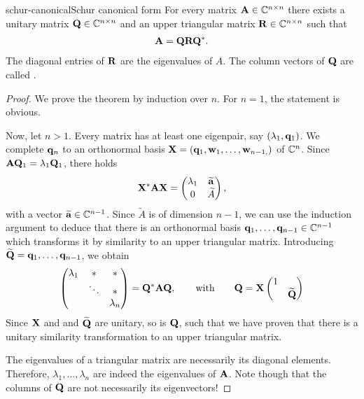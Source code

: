 \begin{Theorem*}{schur-canonical}{Schur canonical form}
  For every matrix $\mathbf A\in\mathbb C^{n\times n}$ there exists a unitary matrix
  $\mathbf Q\in\mathbb C^{n\times n}$ and an upper triangular matrix $\mathbf R\in\mathbb C^{n\times n}$ such
  that
  \begin{gather}
    \mathbf A = \mathbf Q \mathbf R \mathbf Q^*.
  \end{gather}
  The diagonal entries of $\mathbf R$ are the eigenvalues of $A$. The
  column vectors of $\mathbf Q$ are called .
\end{Theorem*}

\begin{proof}
    We prove the theorem by induction over $n$. For $n = 1$, the statement is obvious.

    Now, let $n>1$. Every matrix has at least one eigenpair, say
    $(\lambda_1,\mathbf q_1)$. We complete $\mathbf q_n$ to an orthonormal basis
    $\mathbf X = (\mathbf q_1,\mathbf w_1,\dots,\mathbf w_{n-1,})$ of $\mathbb C^n$.  Since
    $\mathbf A\mathbf Q_1 = \lambda_1\mathbf Q_1$, there holds
  \begin{gather}
    \mathbf X^* \mathbf A \mathbf X =
    \begin{pmatrix}
      \lambda_1 & \widetilde{\mathbf a} \\
      0 & \widetilde A
    \end{pmatrix},
  \end{gather}
  with a vector $\widetilde{\mathbf a}\in\mathbb C^{n-1}$.  Since $\widetilde A$ is
  of dimension $n-1$, we can use the induction argument to deduce that
  there is an orthonormal basis $\mathbf q_1,\dots,\mathbf q_{n-1}\in\mathbb C^{n-1}$
  which transforms it by similarity to an upper triangular
  matrix. Introducing $\widetilde {\mathbf Q} = \mathbf q_1,\dots,\mathbf q_{n-1}$, we obtain
  \begin{gather}
    \begin{pmatrix}
      \lambda_1& *& *\\
      &\ddots& * \\
      &&\lambda_n
    \end{pmatrix}
    = \mathbf Q^*\mathbf A\mathbf Q,
    \qquad\text{with}\qquad
    \mathbf Q = \mathbf X
    \begin{pmatrix}
      1 &\\ &\widetilde {\mathbf Q}
    \end{pmatrix}
  \end{gather}
  Since $\mathbf X$ and and $\widetilde {\mathbf Q}$ are unitary, so is $\mathbf Q$, such
  that we have proven that there is a unitary similarity
  transformation to an upper triangular matrix.

  The eigenvalues of a triangular matrix are necessarily its diagonal
  elements. Therefore, $\lambda_1,\dots,\lambda_n$ are indeed the
  eigenvalues of $\mathbf A$. Note though that the columns of $\mathbf Q$ are
  not necessarily its eigenvectors!
\end{proof}

